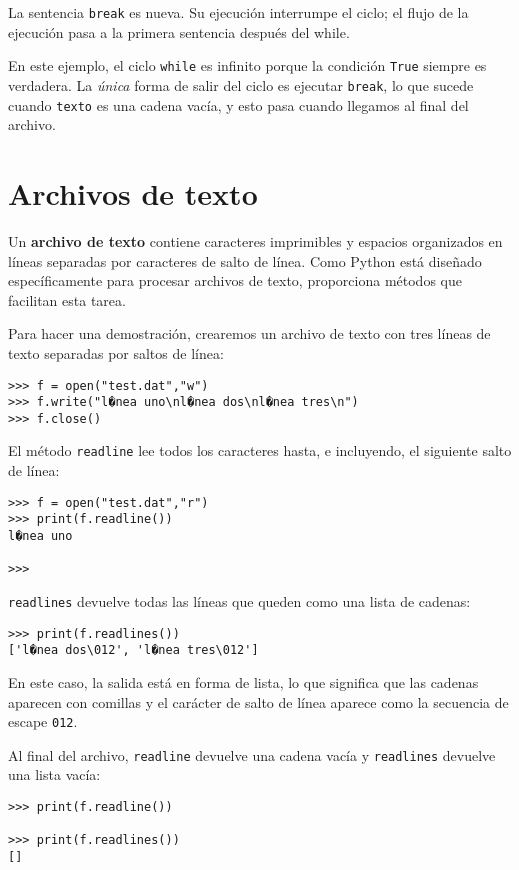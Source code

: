 La sentencia \texttt{break} es nueva. Su ejecución interrumpe el ciclo;
el flujo de la ejecución pasa a la primera sentencia después del while.

 

En este ejemplo, el ciclo \texttt{while} es infinito porque la condición
\texttt{True} siempre es verdadera. La {\em única} forma de salir
del ciclo es ejecutar \texttt{break}, lo que sucede cuando \texttt{texto}
es una cadena vacía, y esto pasa cuando llegamos al final del archivo.

\section{Archivos de texto}

 

Un \textbf{archivo de texto} contiene caracteres imprimibles y espacios
organizados en líneas separadas por caracteres de salto de línea.
Como Python está diseñado específicamente para procesar archivos de
texto, proporciona métodos que facilitan esta tarea.

Para hacer una demostración, crearemos un archivo de texto con tres
líneas de texto separadas por saltos de línea:
\begin{lstlisting}
>>> f = open("test.dat","w")
>>> f.write("l�nea uno\nl�nea dos\nl�nea tres\n")
>>> f.close()
\end{lstlisting}

El método \texttt{readline} lee todos los caracteres hasta, e incluyendo,
el siguiente salto de línea:
\begin{lstlisting}
>>> f = open("test.dat","r")
>>> print(f.readline())
l�nea uno

>>>
\end{lstlisting}

\texttt{readlines} devuelve todas las líneas que queden como una lista
de cadenas:
\begin{lstlisting}
>>> print(f.readlines())
['l�nea dos\012', 'l�nea tres\012']
\end{lstlisting}

En este caso, la salida está en forma de lista, lo que significa que
las cadenas aparecen con comillas y el carácter de salto de línea
aparece como la secuencia de escape \texttt{012}.

Al final del archivo, \texttt{readline} devuelve una cadena vacía
y \texttt{readlines} devuelve una lista vacía:
\begin{lstlisting}
>>> print(f.readline())

>>> print(f.readlines())
[]
\end{lstlisting}

